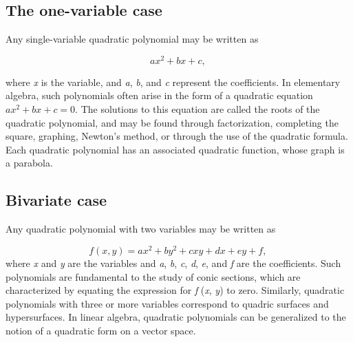 \subsection{The one-variable case}
\label{sss:theo-63b6}




Any single-variable quadratic polynomial may be written as



$$ax^2 + bx + c,\,$$

where \textit{x} is the variable, and \textit{a}, \textit{b}, and \textit{c} represent the
coefficients. In elementary algebra, such polynomials often arise in the form of a
quadratic equation $ax^2 + bx + c = 0$. The solutions to this equation are called the
roots of the quadratic polynomial, and may be found through factorization, completing the
square, graphing, Newton's method, or through the use of the quadratic formula. Each
quadratic polynomial has an associated quadratic function, whose graph is a parabola.




\subsection{Bivariate case}
\label{sss:biva-dd5b}




Any quadratic polynomial with two variables may be written as



$$f(x,y) = a x^2 + b y^2 + cxy + dx+ e y + f, \,$$ where \textit{x} and \textit{y} are the
variables and \textit{a}, \textit{b}, \textit{c}, \textit{d}, \textit{e}, and \textit{f}
are the coefficients. Such polynomials are fundamental to the study of conic sections,
which are characterized by equating the expression for \textit{f} (\textit{x}, \textit{y})
to zero. Similarly, quadratic polynomials with three or more variables correspond to
quadric surfaces and hypersurfaces. In linear algebra, quadratic polynomials can be
generalized to the notion of a quadratic form on a vector space.





